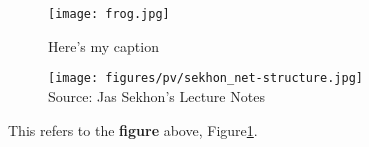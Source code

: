 

\begin{figure}[H]
	\centering %
	\texttt{[image: frog.jpg]}
	\caption{Here's my caption} %
	\label{fig:frog}
\end{figure}

\begin{figure}[H]  %
\centering
\texttt{[image: figures/pv/sekhon\_net-structure.jpg]}\\
\tiny{Source: Jas Sekhon's Lecture Notes}
\end{figure}

This refers to the \textbf{ figure} above, Figure\ref{fig:frog}.

